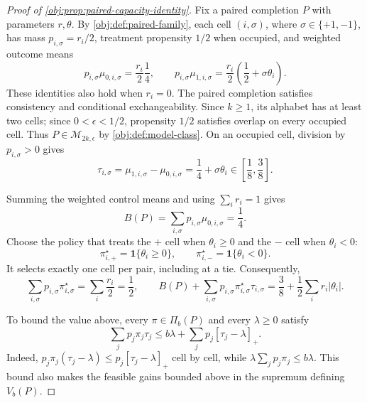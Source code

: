 \begin{proof}[Proof of \cref{obj:prop:paired-capacity-identity}]
Fix a paired completion \(P\) with parameters \(r,\theta\). By \cref{obj:def:paired-family}, each cell \((i,\sigma)\), where \(\sigma\in\{+1,-1\}\), has mass \(p_{i,\sigma}=r_i/2\), treatment propensity \(1/2\) when occupied, and weighted outcome means
\[
p_{i,\sigma}\mu_{0,i,\sigma}=\frac{r_i}{2}\frac14,
\qquad
p_{i,\sigma}\mu_{1,i,\sigma}
=\frac{r_i}{2}\left(\frac12+\sigma\theta_i\right).
\] %
These identities also hold when \(r_i=0\). The paired completion satisfies consistency and conditional exchangeability. Since \(k\geq1\), its alphabet has at least two cells; since \(0<\epsilon<1/2\), propensity \(1/2\) satisfies overlap on every occupied cell. Thus \(P\in\mathcal M_{2k,\epsilon}\) by \cref{obj:def:model-class}. On an occupied cell, division by \(p_{i,\sigma}>0\) gives
\[
\tau_{i,\sigma}
=\mu_{1,i,\sigma}-\mu_{0,i,\sigma}
=\frac14+\sigma\theta_i
\in\left[\frac18,\frac38\right].
\] %

Summing the weighted control means and using \(\sum_i r_i=1\) gives
\[
B(P)=\sum_{i,\sigma}p_{i,\sigma}\mu_{0,i,\sigma}=\frac14.
\] %
Choose the policy that treats the \(+\) cell when \(\theta_i\geq0\) and the \(-\) cell when \(\theta_i<0\):
\[
\pi^\star_{i,+}=\mathbf1\{\theta_i\geq0\},
\qquad
\pi^\star_{i,-}=\mathbf1\{\theta_i<0\}.
\]
It selects exactly one cell per pair, including at a tie. Consequently,
\[
\sum_{i,\sigma}p_{i,\sigma}\pi^\star_{i,\sigma}
=\sum_i\frac{r_i}{2}=\frac12,
\qquad
B(P)+\sum_{i,\sigma}p_{i,\sigma}\pi^\star_{i,\sigma}\tau_{i,\sigma}
=\frac38+\frac12\sum_i r_i|\theta_i|.
\] %

To bound the value above, every \(\pi\in\Pi_b(P)\) and every \(\lambda\geq0\) satisfy
\[
\sum_j p_j\pi_j\tau_j
\leq b\lambda+\sum_j p_j[\tau_j-\lambda]_+.
\]
Indeed, \(p_j\pi_j(\tau_j-\lambda)\leq p_j[\tau_j-\lambda]_+\) cell by cell, while \(\lambda\sum_jp_j\pi_j\leq b\lambda\). This bound also makes the feasible gains bounded above in the supremum defining \(V_b(P)\). %


\end{proof}
